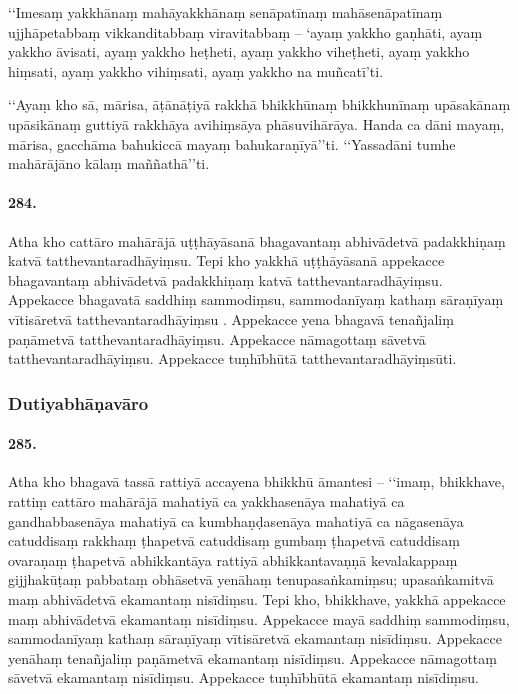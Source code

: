 ‘‘Imesaṃ yakkhānaṃ mahāyakkhānaṃ senāpatīnaṃ mahāsenāpatīnaṃ ujjhāpetabbaṃ vikkanditabbaṃ viravitabbaṃ – ‘ayaṃ yakkho gaṇhāti, ayaṃ yakkho āvisati, ayaṃ yakkho heṭheti, ayaṃ yakkho viheṭheti, ayaṃ yakkho hiṃsati, ayaṃ yakkho vihiṃsati, ayaṃ yakkho na muñcatī’ti.

‘‘Ayaṃ kho sā, mārisa, āṭānāṭiyā rakkhā bhikkhūnaṃ bhikkhunīnaṃ upāsakānaṃ upāsikānaṃ guttiyā rakkhāya avihiṃsāya phāsuvihārāya. Handa ca dāni mayaṃ, mārisa, gacchāma bahukiccā mayaṃ bahukaraṇīyā’’ti. ‘‘Yassadāni tumhe mahārājāno kālaṃ maññathā’’ti.

\paragraph{284.} Atha kho cattāro mahārājā uṭṭhāyāsanā bhagavantaṃ abhivādetvā padakkhiṇaṃ katvā tatthevantaradhāyiṃsu. Tepi kho yakkhā uṭṭhāyāsanā appekacce bhagavantaṃ abhivādetvā padakkhiṇaṃ katvā tatthevantaradhāyiṃsu. Appekacce bhagavatā saddhiṃ sammodiṃsu, sammodanīyaṃ kathaṃ sāraṇīyaṃ vītisāretvā tatthevantaradhāyiṃsu . Appekacce yena bhagavā tenañjaliṃ paṇāmetvā tatthevantaradhāyiṃsu. Appekacce nāmagottaṃ sāvetvā tatthevantaradhāyiṃsu. Appekacce tuṇhībhūtā tatthevantaradhāyiṃsūti.


\subsubsection{Dutiyabhāṇavāro}

\paragraph{285.} Atha kho bhagavā tassā rattiyā accayena bhikkhū āmantesi – ‘‘imaṃ, bhikkhave, rattiṃ cattāro mahārājā mahatiyā ca yakkhasenāya mahatiyā ca gandhabbasenāya mahatiyā ca kumbhaṇḍasenāya mahatiyā ca nāgasenāya catuddisaṃ rakkhaṃ ṭhapetvā catuddisaṃ gumbaṃ ṭhapetvā catuddisaṃ ovaraṇaṃ ṭhapetvā abhikkantāya rattiyā abhikkantavaṇṇā kevalakappaṃ gijjhakūṭaṃ pabbataṃ obhāsetvā yenāhaṃ tenupasaṅkamiṃsu; upasaṅkamitvā maṃ abhivādetvā ekamantaṃ nisīdiṃsu. Tepi kho, bhikkhave, yakkhā appekacce maṃ abhivādetvā ekamantaṃ nisīdiṃsu. Appekacce mayā saddhiṃ sammodiṃsu, sammodanīyaṃ kathaṃ sāraṇīyaṃ vītisāretvā ekamantaṃ nisīdiṃsu. Appekacce yenāhaṃ tenañjaliṃ paṇāmetvā ekamantaṃ nisīdiṃsu. Appekacce nāmagottaṃ sāvetvā ekamantaṃ nisīdiṃsu. Appekacce tuṇhībhūtā ekamantaṃ nisīdiṃsu.


